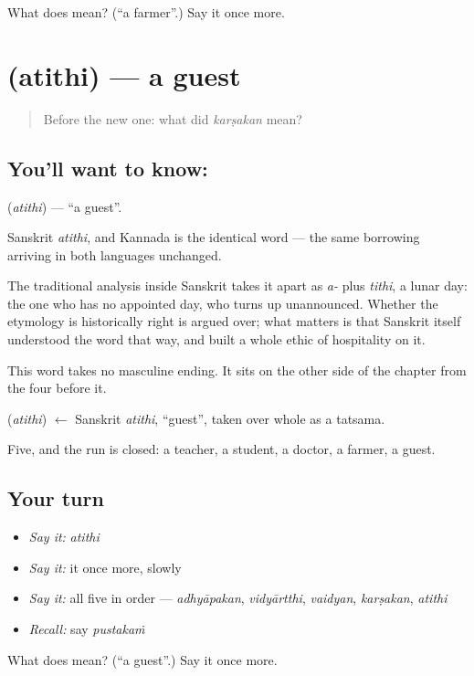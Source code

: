 \begin{tcolorbox}[breakable,colback=teal!4,colframe=teal!35!black,title={Before you move on}]
What does  mean? (\textquotedblleft{}a farmer\textquotedblright{}.) Say it once more.
\end{tcolorbox}
\section[\texorpdfstring{\ml{അതിഥി} (atithi)}{അതിഥി (atithi)}]{ (atithi) — a guest}

\label{lesson:ML-C48-guest}



\begin{quote}
Before the new one: what did \emph{karṣakan} mean?
\end{quote}

\subsection*{You'll want to know: }
\textbf{} (\emph{atithi}) — \textquotedblleft{}a guest\textquotedblright{}.

Sanskrit \emph{atithi}, and Kannada  is the identical word — the same borrowing arriving in both languages unchanged.

The traditional analysis inside Sanskrit takes it apart as \emph{a-} plus \emph{tithi}, a lunar day: the one who has no appointed day, who turns up unannounced. Whether the etymology is historically right is argued over; what matters is that Sanskrit itself understood the word that way, and built a whole ethic of hospitality on it.

This word takes no masculine ending. It sits on the other side of the chapter from the four before it.

\begin{cousinweb}
\textbf{} (\emph{atithi}) $\leftarrow$ Sanskrit \emph{atithi}, \textquotedblleft{}guest\textquotedblright{}, taken over whole as a tatsama.
\end{cousinweb}

\begin{grammarlens}[title={What you've built}]
Five, and the run is closed: a teacher, a student, a doctor, a farmer, a guest.
\end{grammarlens}

\subsection*{Your turn}
\begin{itemize}
\raggedright
  \item \emph{Say it:} \emph{atithi}
  \item \emph{Say it:} it once more, slowly
  \item \emph{Say it:} all five in order — \emph{adhyāpakan}, \emph{vidyārtthi}, \emph{vaidyan}, \emph{karṣakan}, \emph{atithi}
  \item \emph{Recall:} say \emph{pustakaṁ}
\end{itemize}

\begin{tcolorbox}[breakable,colback=teal!4,colframe=teal!35!black,title={Before you move on}]
What does  mean? (\textquotedblleft{}a guest\textquotedblright{}.) Say it once more.
\end{tcolorbox}
